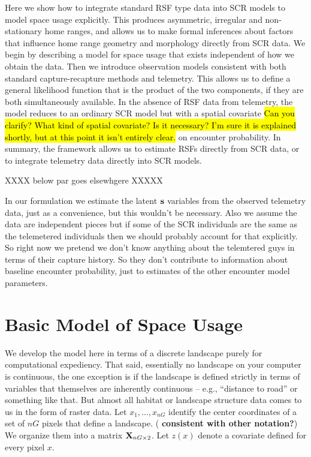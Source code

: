 Here we show how to integrate standard RSF type data into SCR models
to model space usage explicitly. This produces asymmetric, irregular
and non-stationary home ranges, and allows us to make formal
inferences about factors that influence home range geometry and
morphology directly from SCR data.  We begin by describing a model for
space usage that exists independent of how we obtain the data. Then we
introduce observation models consistent with both standard
capture-recapture methods and telemetry.  This allows us to define a
general likelihood function that is the product of the two
components, if they are both simultaneously available.  In the absence
of RSF data from telemetry, the model reduces to an ordinary SCR model
but with a spatial covariate
\hl{ Can you clarify? What kind of spatial covariate? Is it necessary?
I'm sure it is explained shortly, but at this point it isn't entirely clear.}
on encounter probability.  In summary,
the framework allows us to estimate RSFs directly from SCR data, or to
integrate telemetry data directly into SCR models.

XXXX below par goes elsewhgere XXXXX

In our formulation we estimate the latent ${\bf s}$ variables from the observed telemetry
data, just as a convenience, but this wouldn't be necessary.
Also we assume the data are independent pieces but if some of the SCR
individuals are the same as the telemetered individuals then we should
probably account for that explicitly. So right now we pretend we don't
know anything about the telemtered guys in terms of their capture
history. So they don't contribute to information about baseline
encounter probability, just to estimates of the other encounter model
parameters.



\section{Basic Model of Space Usage}
\label{rsf.sec.rsfmodel}

We develop the model here in terms of a discrete landscape purely for
computational expediency. That said, essentially no landscape on your
computer is continuous, the one exception is if the landscape is
defined strictly in terms of variables that themselves are inherently
continuous -- e.g., ``distance to road'' or something like that.  But
almost all habitat or landscape structure data comes to us in the form
of raster data.  Let $x_{1},\ldots,x_{nG}$ identify the center
coordinates of a set of $nG$ pixels that define a landscape. ({\bf
  consistent with other notation?}) We organize them into a matrix
${\bf X}_{nG \times 2}$.  Let $z(x)$ denote a covariate defined for
every pixel $x$.

